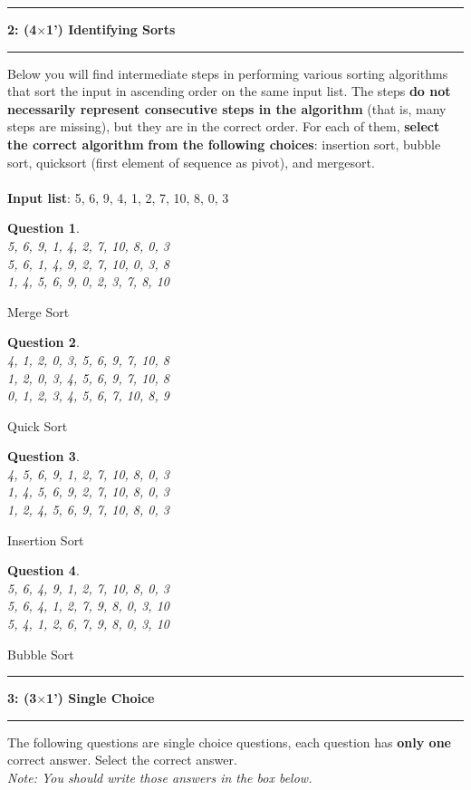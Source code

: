 \documentclass[10.5pt]{article}
\newcommand\question[2]{\vspace{.25in}\hrule\textbf{#1: #2}\vspace{.5em}\hrule\vspace{.10in}}
\newtheorem{Q}{Question}
\begin{document}
\question{2}{(4$\times$1') Identifying Sorts}
    Below you will find intermediate steps in performing various sorting algorithms that sort the input in ascending order on the same input list. The steps \textbf{do not necessarily represent consecutive steps in the algorithm} (that is, many steps are missing), but they are in the correct order. For each of them, \textbf{select the correct algorithm} \textbf{from the
following choices}: insertion sort, bubble sort, quicksort (first element of sequence as pivot), and mergesort.
\\\\
\textbf{Input list}: 5, 6, 9, 4, 1, 2, 7, 10, 8, 0, 3


\begin{Q} \textcolor{white}{ }\\
5, 6, 9, 1, 4, 2, 7, 10, 8, 0, 3\\
5, 6, 1, 4, 9, 2, 7, 10, 0, 3, 8\\
1, 4, 5, 6, 9, 0, 2, 3, 7, 8, 10\\
\end{Q}
Merge Sort\\

\begin{Q}\textcolor{white}{ }\\
4, 1, 2, 0, 3, 5, 6, 9, 7, 10, 8\\
1, 2, 0, 3, 4, 5, 6, 9, 7, 10, 8\\
0, 1, 2, 3, 4, 5, 6, 7, 10, 8, 9\\
\end{Q}
Quick Sort\\

\begin{Q}\textcolor{white}{ }\\
4, 5, 6, 9, 1, 2, 7, 10, 8, 0, 3\\
1, 4, 5, 6, 9, 2, 7, 10, 8, 0, 3\\
1, 2, 4, 5, 6, 9, 7, 10, 8, 0, 3\\
\end{Q}
Insertion Sort\\
\begin{Q}\textcolor{white}{ }\\
5, 6, 4, 9, 1, 2, 7, 10, 8, 0, 3\\
5, 6, 4, 1, 2, 7, 9, 8, 0, 3, 10\\
5, 4, 1, 2, 6, 7, 9, 8, 0, 3, 10\\
\end{Q}
Bubble Sort \\
	
\pagebreak
\question{3}{(3$\times$1') Single Choice}
The following \textit{} questions are single choice questions, each question has \textbf{only one} correct answer. Select the correct answer.\\
\textit{Note: You should write those answers in the box below.}
\end{document}

